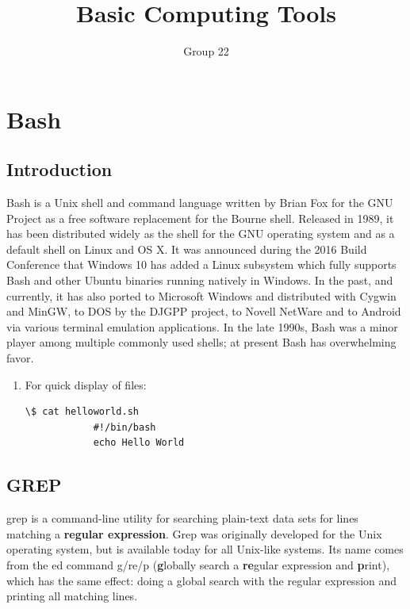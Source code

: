 \documentclass{article}
\author{ Group 22 }
\date{}
\title{Basic Computing Tools}
\begin{document}
	
	\maketitle
	
	\section{Bash}
        \subsection{Introduction}
Bash is a Unix shell and command language written by Brian Fox for the GNU Project as a free software replacement for the Bourne shell. Released in 1989, it has been distributed widely as the shell for the GNU operating system and as a default shell on Linux and OS X. It was announced during the 2016 Build Conference that Windows 10 has added a Linux subsystem which fully supports Bash and other Ubuntu binaries running natively in Windows. In the past, and currently, it has also ported to Microsoft Windows and distributed with Cygwin and MinGW, to DOS by the DJGPP project, to Novell NetWare and to Android via various terminal emulation applications. In the late 1990s, Bash was a minor player among multiple commonly used shells; at present Bash has overwhelming favor.
\begin{enumerate}
    \item
        For quick display of files:
        \begin{lstlisting}[style=BashInputStyle]
            \$ cat helloworld.sh
            #!/bin/bash
            echo Hello World
        \end{lstlisting}
\end{enumerate}
    \subsection{GREP}
    grep is a command-line utility for searching plain-text data sets for lines matching a \textbf{regular expression}. Grep was originally developed for the Unix operating system, but is available today for all Unix-like systems. Its name comes from the ed command g/re/p (\textbf{g}lobally search a \textbf{re}gular expression and \textbf{p}rint), which has the same effect: doing a global search with the regular expression and printing all matching lines.
\end{document}
